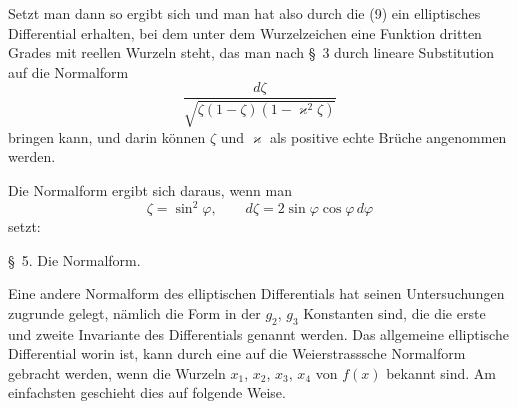 
Setzt man dann
so ergibt sich
und man hat also durch die  (9) ein elliptisches Differential erhalten, bei dem unter dem Wurzelzeichen eine Funktion dritten Grades mit reellen Wurzeln steht, das man nach \S\ 3 durch lineare Substitution auf die Normalform
\[
\frac{d\zeta}{\sqrt{\zeta(1-\zeta)(1-\varkappa^2\zeta)}}
\]
bringen kann, und darin können $\zeta$ und $\varkappa$ als positive echte Brüche angenommen werden.

Die  Normalform ergibt sich daraus, wenn man
\[
\zeta = \sin^2\varphi, \qquad d\zeta = 2\sin\varphi\cos\varphi\,d\varphi
\]
setzt:

\begin{center}
\S\ 5. Die  Normalform.
\end{center}

Eine andere Normalform des elliptischen Differentials hat  seinen Untersuchungen zugrunde gelegt, nämlich die Form
in der $g_2$, $g_3$ Konstanten sind, die die erste und zweite Invariante des Differentials genannt werden. Das allgemeine elliptische Differential
worin
ist, kann durch eine  auf die Weierstrasssche Normalform gebracht werden, wenn die Wurzeln $x_1$, $x_2$, $x_3$, $x_4$ von $f(x)$ bekannt sind. Am einfachsten geschieht dies auf folgende Weise.
